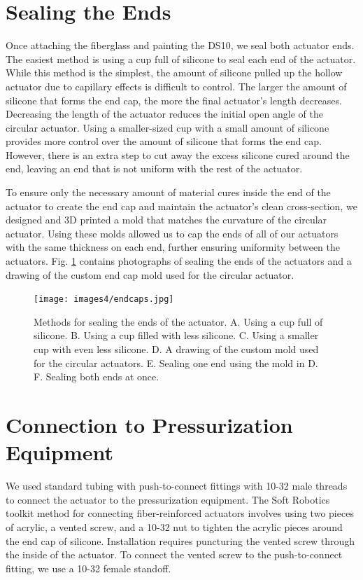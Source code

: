 \clearpage
\section{Sealing the Ends}
Once attaching the fiberglass and painting the DS10, we seal both actuator ends. The easiest method is using a cup full of silicone to seal each end of the actuator. While this method is the simplest, the amount of silicone pulled up the hollow actuator due to capillary effects is difficult to control. The larger the amount of silicone that forms the end cap, the more the final actuator's length decreases. Decreasing the length of the actuator reduces the initial open angle of the circular actuator. Using a smaller-sized cup with a small amount of silicone provides more control over the amount of silicone that forms the end cap. However, there is an extra step to cut away the excess silicone cured around the end, leaving an end that is not uniform with the rest of the actuator. 

To ensure only the necessary amount of material cures inside the end of the actuator to create the end cap and maintain the actuator's clean cross-section, we designed and 3D printed a mold that matches the curvature of the circular actuator. Using these molds allowed us to cap the ends of all of our actuators with the same thickness on each end, further ensuring uniformity between the actuators. Fig. \ref{fig:endcaps} contains photographs of sealing the ends of the actuators and a drawing of the custom end cap mold used for the circular actuator. 

\begin{figure}[h!]
    \centering
    \texttt{[image: images4/endcaps.jpg]}
    \caption{Methods for sealing the ends of the actuator. A. Using a cup full of silicone. B. Using a cup filled with less silicone. C. Using a smaller cup with even less silicone. D. A drawing of the custom mold used for the circular actuators. E. Sealing one end using the mold in D. F. Sealing both ends at once. }
    \label{fig:endcaps}
\end{figure}

\clearpage
\section{Connection to Pressurization Equipment}
We used standard tubing with push-to-connect fittings with 10-32 male threads to connect the actuator to the pressurization equipment. The Soft Robotics toolkit method for connecting fiber-reinforced actuators involves using two pieces of acrylic, a vented screw, and a 10-32 nut to tighten the acrylic pieces around the end cap of silicone. Installation requires puncturing the vented screw through the inside of the actuator. To connect the vented screw to the push-to-connect fitting, we use a 10-32 female standoff. 

